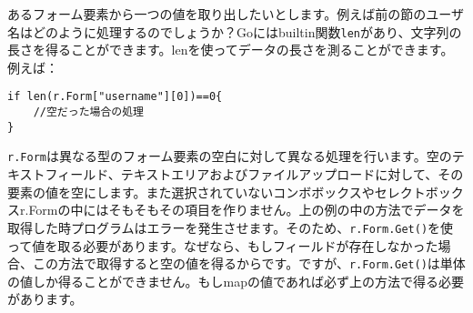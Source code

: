 あるフォーム要素から一つの値を取り出したいとします。例えば前の節のユーザ名はどのように処理するのでしょうか？Goにはbuiltin関数\texttt{len}があり、文字列の長さを得ることができます。lenを使ってデータの長さを測ることができます。例えば：


\begin{lstlisting}[numbers=none]
if len(r.Form["username"][0])==0{
    //空だった場合の処理
}
\end{lstlisting}

\texttt{r.Form}は異なる型のフォーム要素の空白に対して異なる処理を行います。空のテキストフィールド、テキストエリアおよびファイルアップロードに対して、その要素の値を空にします。また選択されていないコンボボックスやセレクトボックスr.Formの中にはそもそもその項目を作りません。上の例の中の方法でデータを取得した時プログラムはエラーを発生させます。そのため、\texttt{r.Form.Get()}を使って値を取る必要があります。なぜなら、もしフィールドが存在しなかった場合、この方法で取得すると空の値を得るからです。ですが、\texttt{r.Form.Get()}は単体の値しか得ることができません。もしmapの値であれば必ず上の方法で得る必要があります。
